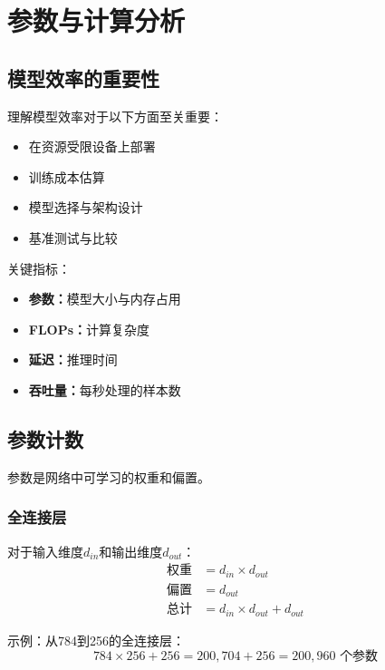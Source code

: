 \clearpage
\cleardoublepage

\chapter{参数与计算分析}

\section{模型效率的重要性}

理解模型效率对于以下方面至关重要：
\begin{itemize}
    \item 在资源受限设备上部署
    \item 训练成本估算
    \item 模型选择与架构设计
    \item 基准测试与比较
\end{itemize}

关键指标：
\begin{itemize}
    \item \textbf{参数：}模型大小与内存占用
    \item \textbf{FLOPs：}计算复杂度
    \item \textbf{延迟：}推理时间
    \item \textbf{吞吐量：}每秒处理的样本数
\end{itemize}

\section{参数计数}

参数是网络中可学习的权重和偏置。

\subsection{全连接层}

对于输入维度$d_{in}$和输出维度$d_{out}$：
\begin{align}
\text{权重} &= d_{in} \times d_{out} \\
\text{偏置} &= d_{out} \\
\text{总计} &= d_{in} \times d_{out} + d_{out}
\end{align}

示例：从784到256的全连接层：
\begin{equation}
784 \times 256 + 256 = 200,704 + 256 = 200,960 \text{ 个参数}
\end{equation}

